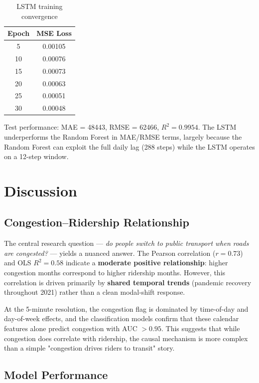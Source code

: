 \documentclass[12pt,a4paper]{article}
\begin{document}
\begin{table}[H]
\centering
\caption{LSTM training convergence}
\begin{tabular}{cc}
\toprule
\textbf{Epoch} & \textbf{MSE Loss} \\
\midrule
5  & 0.00105 \\
10 & 0.00076 \\
15 & 0.00073 \\
20 & 0.00063 \\
25 & 0.00051 \\
30 & 0.00048 \\
\bottomrule
\end{tabular}
\end{table}

Test performance: MAE = \num{48443}, RMSE = \num{62466}, $R^2 = 0.9954$. The LSTM underperforms the Random Forest in MAE/RMSE terms, largely because the Random Forest can exploit the full daily lag (288 steps) while the LSTM operates on a 12-step window.

\section{Discussion}

\subsection{Congestion–Ridership Relationship}

The central research question — \emph{do people switch to public transport when roads are congested?} — yields a nuanced answer. The Pearson correlation ($r = 0.73$) and OLS $R^2 = 0.58$ indicate a \textbf{moderate positive relationship}: higher congestion months correspond to higher ridership months. However, this correlation is driven primarily by \textbf{shared temporal trends} (pandemic recovery throughout 2021) rather than a clean modal-shift response.

At the 5-minute resolution, the congestion flag is dominated by time-of-day and day-of-week effects, and the classification models confirm that these calendar features alone predict congestion with AUC $> 0.95$. This suggests that while congestion does correlate with ridership, the causal mechanism is more complex than a simple "congestion drives riders to transit" story.

\subsection{Model Performance}
\end{document}
